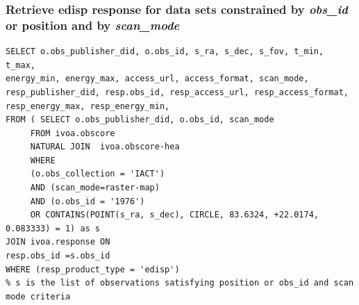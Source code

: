 \subsubsection*{Retrieve edisp response for data sets constrained by {\em obs\_id} or position and by {\em scan\_mode}}
{\small
\begin{verbatim}
SELECT o.obs_publisher_did, o.obs_id, s_ra, s_dec, s_fov, t_min, t_max, 
energy_min, energy_max, access_url, access_format, scan_mode,
resp_publisher_did, resp.obs_id, resp_access_url, resp_access_format, 
resp_energy_max, resp_energy_min, 
FROM ( SELECT o.obs_publisher_did, o.obs_id, scan_mode 
     FROM ivoa.obscore 
     NATURAL JOIN  ivoa.obscore-hea  
     WHERE
     (o.obs_collection = 'IACT') 
     AND (scan_mode=raster-map)
     AND (o.obs_id = '1976')
     OR CONTAINS(POINT(s_ra, s_dec), CIRCLE, 83.6324, +22.0174, 0.083333) = 1) as s
JOIN ivoa.response ON 
resp.obs_id =s.obs_id
WHERE (resp_product_type = 'edisp')
% s is the list of observations satisfying position or obs_id and scan mode criteria
\end{verbatim}
}%



